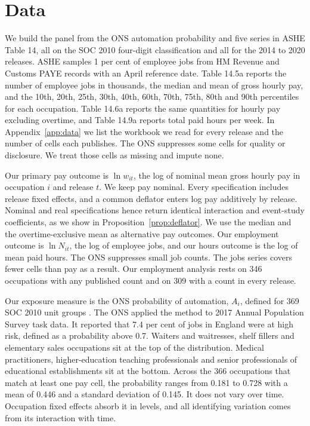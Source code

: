 \documentclass[12pt,leqno]{article}
\begin{document}
\section{Data}\label{sec:data}

We build the panel from the ONS automation probability and five series in ASHE Table 14, all on the SOC 2010 four-digit classification and all for the 2014 to 2020 releases. ASHE samples 1 per cent of employee jobs from HM Revenue and Customs PAYE records with an April reference date. Table 14.5a reports the number of employee jobs in thousands, the median and mean of gross hourly pay, and the 10th, 20th, 25th, 30th, 40th, 60th, 70th, 75th, 80th and 90th percentiles for each occupation. Table 14.6a reports the same quantities for hourly pay excluding overtime, and Table 14.9a reports total paid hours per week. In Appendix~\ref{app:data} we list the workbook we read for every release and the number of cells each publishes. The ONS suppresses some cells for quality or disclosure. We treat those cells as missing and impute none.

Our primary pay outcome is $\ln w_{it}$, the log of nominal mean gross hourly pay in occupation $i$ and release $t$. We keep pay nominal. Every specification includes release fixed effects, and a common deflator enters log pay additively by release. Nominal and real specifications hence return identical interaction and event-study coefficients, as we show in Proposition~\ref{prop:deflator}. We use the median and the overtime-exclusive mean as alternative pay outcomes. Our employment outcome is $\ln N_{it}$, the log of employee jobs, and our hours outcome is the log of mean paid hours. The ONS suppresses small job counts. The jobs series covers fewer cells than pay as a result. Our employment analysis rests on 346 occupations with any published count and on 309 with a count in every release.

Our exposure measure is the ONS probability of automation, $A_i$, defined for 369 SOC 2010 unit groups \citep{ons2019automation}. The ONS applied the \citet{frey2017future} method to 2017 Annual Population Survey task data. It reported that 7.4 per cent of jobs in England were at high risk, defined as a probability above 0.7. Waiters and waitresses, shelf fillers and elementary sales occupations sit at the top of the distribution. Medical practitioners, higher-education teaching professionals and senior professionals of educational establishments sit at the bottom. Across the 366 occupations that match at least one pay cell, the probability ranges from 0.181 to 0.728 with a mean of 0.446 and a standard deviation of 0.145. It does not vary over time. Occupation fixed effects absorb it in levels, and all identifying variation comes from its interaction with time.
\end{document}

